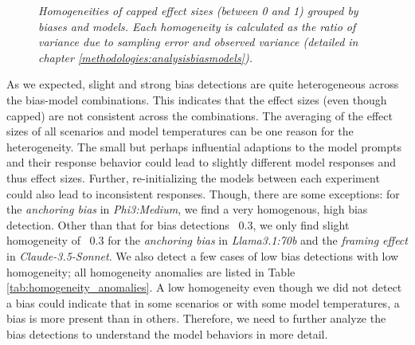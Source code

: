 \begin{figure}[htbp]
    \centering
    
    \caption[Heatmap of homogeneities grouped by biases and models]{\centering \textit{Homogeneities of capped effect sizes (between 0 and 1) grouped by biases and models. Each homogeneity is calculated as the ratio of variance due to sampling error and observed variance (detailed in chapter \ref{methodologies:analysisbiasmodels}).}}
    \label{fig:homogeneity-heatmap}
\end{figure}

\par As we expected, slight and strong bias detections are quite heterogeneous across the bias-model combinations. This indicates that the effect sizes (even though capped) are not consistent across the combinations. The averaging of the effect sizes of all scenarios and model temperatures can be one reason for the heterogeneity. The small but perhaps influential adaptions to the model prompts and their response behavior could lead to slightly different model responses and thus effect sizes. Further, re-initializing the models between each experiment could also lead to inconsistent responses. Though, there are some exceptions: for the \textit{anchoring bias} in \textit{Phi3:Medium}, we find a very homogenous, high bias detection. Other than that for bias detections \geq\, 0.3, we only find slight homogeneity of \geq\, 0.3 for the \textit{anchoring bias} in \textit{Llama3.1:70b} and the \textit{framing effect} in \textit{Claude-3.5-Sonnet}. We also detect a few cases of low bias detections with low homogeneity; all homogeneity anomalies are listed in Table \ref{tab:homogeneity_anomalies}. A low homogeneity even though we did not detect a bias could indicate that in some scenarios or with some model temperatures, a bias is more present than in others. Therefore, we need to further analyze the bias detections to understand the model behaviors in more detail.

